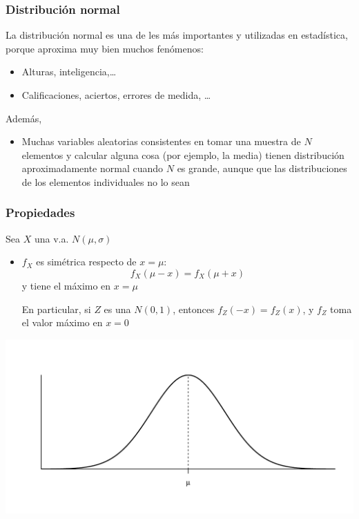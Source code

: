 \documentclass[handout]{beamer}\usepackage[]{graphicx}\usepackage[]{color}
\theoremstyle{plain}
\theoremstyle{definition}
\begin{document}
\begin{frame} 
\frametitle{Distribución normal}



La distribución normal es una de les más importantes y utilizadas en estadística, porque aproxima muy bien muchos fenómenos:
\medskip

\begin{itemize}
\item Alturas, inteligencia,\ldots
\item Calificaciones, aciertos, errores de medida, \ldots
\end{itemize}

Además, 
\begin{itemize}
\item Muchas variables aleatorias consistentes en  tomar una muestra de $N$ elementos y calcular alguna cosa (por ejemplo, la media) tienen distribución aproximadamente normal cuando $N$ es grande, aunque  que las distribuciones de los elementos individuales no lo sean
\end{itemize}


\end{frame}


\begin{frame}
\frametitle{Propiedades} 
\vspace*{-1ex}

Sea $X$ una v.a. $N(\mu,\sigma)$
\medskip

\begin{itemize}
\item $f_X$ es simétrica respecto de $x=\mu$:
$$
f_{X}(\mu-x)=f_{X}(\mu+x)
$$
y  tiene  el máximo en $x=\mu$
\medskip

En particular, si $Z$ es una $N(0,1)$, entonces
$f_{Z}(-x)=f_{Z}(x)$, y $f_Z$ toma el valor máximo en  $x=0$
\end{itemize}
\vspace*{-5ex}

\begin{center}
\includegraphics[width=\linewidth]{simn}
\end{center}
\end{frame}
\end{document}
